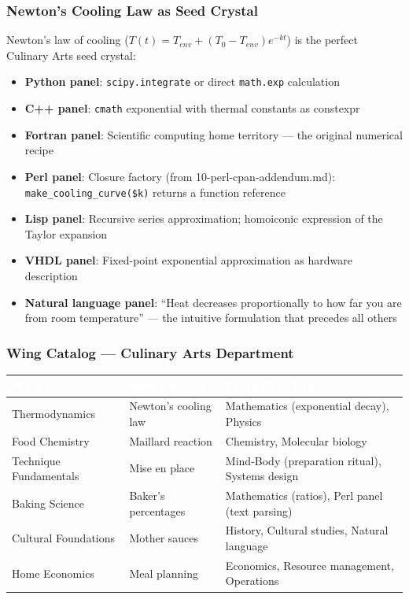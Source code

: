 \documentclass[11pt,letterpaper]{article}
\newcommand{\tableheader}[1]{\textbf{\sffamily\textcolor{white}{#1}}}
\begin{document}
\subsubsection{Newton's Cooling Law as Seed Crystal}

Newton's law of cooling ($T(t) = T_{env} + (T_0 - T_{env})e^{-kt}$) is the perfect Culinary Arts seed crystal:
\begin{itemize}[leftmargin=1.5em]
  \item \textbf{Python panel}: \texttt{scipy.integrate} or direct \texttt{math.exp} calculation
  \item \textbf{C++ panel}: \texttt{cmath} exponential with thermal constants as constexpr
  \item \textbf{Fortran panel}: Scientific computing home territory --- the original numerical recipe
  \item \textbf{Perl panel}: Closure factory (from 10-perl-cpan-addendum.md): \texttt{make\_cooling\_curve(\$k)} returns a function reference
  \item \textbf{Lisp panel}: Recursive series approximation; homoiconic expression of the Taylor expansion
  \item \textbf{VHDL panel}: Fixed-point exponential approximation as hardware description
  \item \textbf{Natural language panel}: ``Heat decreases proportionally to how far you are from room temperature'' --- the intuitive formulation that precedes all others
\end{itemize}

\subsubsection{Wing Catalog --- Culinary Arts Department}

\begin{center}
\begin{tabularx}{\textwidth}{L{3.5cm}L{3cm}X}
\toprule
{}
\tableheader{Wing} & \tableheader{Seed Concept} & \tableheader{Cross-Dept Links} \\
\midrule
Thermodynamics & Newton's cooling law & Mathematics (exponential decay), Physics \\
Food Chemistry & Maillard reaction & Chemistry, Molecular biology \\
Technique Fundamentals & Mise en place & Mind-Body (preparation ritual), Systems design \\
Baking Science & Baker's percentages & Mathematics (ratios), Perl panel (text parsing) \\
Cultural Foundations & Mother sauces & History, Cultural studies, Natural language \\
Home Economics & Meal planning & Economics, Resource management, Operations \\
\bottomrule
\end{tabularx}
\end{center}
\end{document}
